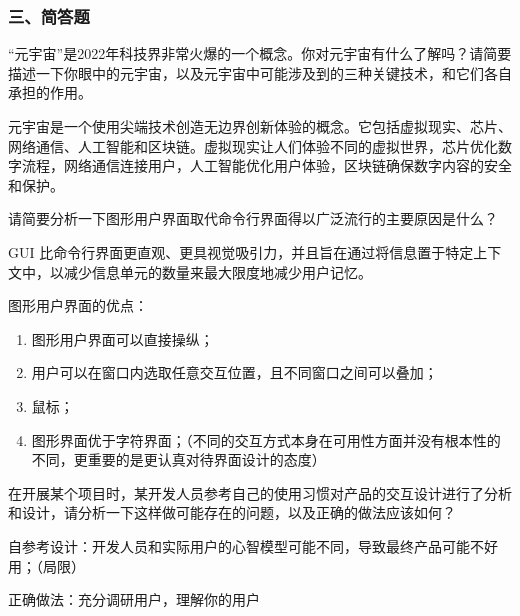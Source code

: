 \subsubsection*{三、简答题}
\setcounter{problemname}{0}

\begin{problem}
“元宇宙”是2022年科技界非常火爆的一个概念。你对元宇宙有什么了解吗？请简要描述一下你眼中的元宇宙，以及元宇宙中可能涉及到的三种关键技术，和它们各自承担的作用。
\end{problem}

\begin{solution}
元宇宙是一个使用尖端技术创造无边界创新体验的概念。它包括虚拟现实、芯片、网络通信、人工智能和区块链。虚拟现实让人们体验不同的虚拟世界，芯片优化数字流程，网络通信连接用户，人工智能优化用户体验，区块链确保数字内容的安全和保护。
\end{solution}



\begin{problem}
请简要分析一下图形用户界面取代命令行界面得以广泛流行的主要原因是什么？
\end{problem}

\begin{solution}
GUI 比命令行界面更直观、更具视觉吸引力，并且旨在通过将信息置于特定上下文中，以减少信息单元的数量来最大限度地减少用户记忆。

图形用户界面的优点：
\begin{enumerate}[label=\arabic*.]
    \item 图形用户界面可以直接操纵；
    \item 用户可以在窗口内选取任意交互位置，且不同窗口之间可以叠加；
    \item 鼠标；
    \item 图形界面优于字符界面；（不同的交互方式本身在可用性方面并没有根本性的不同，更重要的是更认真对待界面设计的态度）
\end{enumerate}
\end{solution}



\begin{problem}
在开展某个项目时，某开发人员参考自己的使用习惯对产品的交互设计进行了分析和设计，请分析一下这样做可能存在的问题，以及正确的做法应该如何？
\end{problem}

\begin{solution}
自参考设计：开发人员和实际用户的心智模型可能不同，导致最终产品可能不好用；（局限）

正确做法：充分调研用户，理解你的用户
\end{solution}



